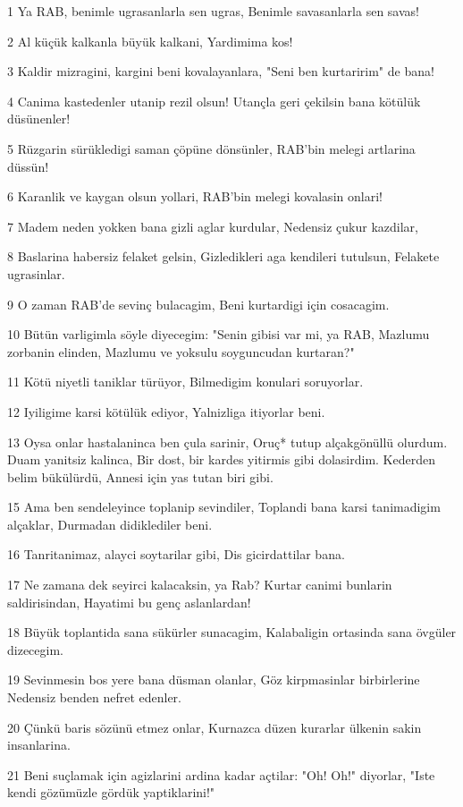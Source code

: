 \par 1 Ya RAB, benimle ugrasanlarla sen ugras, Benimle savasanlarla sen savas!
\par 2 Al küçük kalkanla büyük kalkani, Yardimima kos!
\par 3 Kaldir mizragini, kargini beni kovalayanlara, "Seni ben kurtaririm" de bana!
\par 4 Canima kastedenler utanip rezil olsun! Utançla geri çekilsin bana kötülük düsünenler!
\par 5 Rüzgarin sürükledigi saman çöpüne dönsünler, RAB'bin melegi artlarina düssün!
\par 6 Karanlik ve kaygan olsun yollari, RAB'bin melegi kovalasin onlari!
\par 7 Madem neden yokken bana gizli aglar kurdular, Nedensiz çukur kazdilar,
\par 8 Baslarina habersiz felaket gelsin, Gizledikleri aga kendileri tutulsun, Felakete ugrasinlar.
\par 9 O zaman RAB'de sevinç bulacagim, Beni kurtardigi için cosacagim.
\par 10 Bütün varligimla söyle diyecegim: "Senin gibisi var mi, ya RAB, Mazlumu zorbanin elinden, Mazlumu ve yoksulu soyguncudan kurtaran?"
\par 11 Kötü niyetli taniklar türüyor, Bilmedigim konulari soruyorlar.
\par 12 Iyiligime karsi kötülük ediyor, Yalnizliga itiyorlar beni.
\par 13 Oysa onlar hastalaninca ben çula sarinir, Oruç* tutup alçakgönüllü olurdum. Duam yanitsiz kalinca, Bir dost, bir kardes yitirmis gibi dolasirdim. Kederden belim bükülürdü, Annesi için yas tutan biri gibi.
\par 15 Ama ben sendeleyince toplanip sevindiler, Toplandi bana karsi tanimadigim alçaklar, Durmadan didiklediler beni.
\par 16 Tanritanimaz, alayci soytarilar gibi, Dis gicirdattilar bana.
\par 17 Ne zamana dek seyirci kalacaksin, ya Rab? Kurtar canimi bunlarin saldirisindan, Hayatimi bu genç aslanlardan!
\par 18 Büyük toplantida sana sükürler sunacagim, Kalabaligin ortasinda sana övgüler dizecegim.
\par 19 Sevinmesin bos yere bana düsman olanlar, Göz kirpmasinlar birbirlerine Nedensiz benden nefret edenler.
\par 20 Çünkü baris sözünü etmez onlar, Kurnazca düzen kurarlar ülkenin sakin insanlarina.
\par 21 Beni suçlamak için agizlarini ardina kadar açtilar: "Oh! Oh!" diyorlar, "Iste kendi gözümüzle gördük yaptiklarini!"

